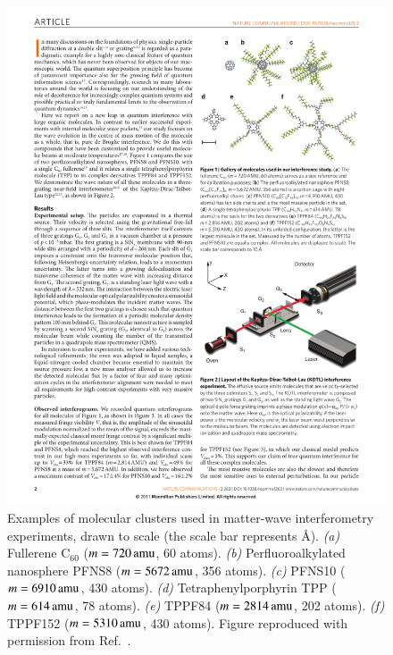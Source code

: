 \documentclass[3p,sort&compress]{elsarticle}
\begin{document}
\begin{figure}
\centering
\includegraphics[scale=1]{clusters.pdf}
\caption{Examples of molecular clusters used in matter-wave interferometry experiments, drawn to scale (the scale bar represents \unit[10]{\AA}). \emph{(a)} Fullerene C$_{60}$ ($m = \unit[720]{amu}$, 60 atoms). \emph{(b)} Perfluoroalkylated nanosphere PFNS8 ($m = \unit[5672]{amu}$, 356 atoms). \emph{(c)} PFNS10 ($m = \unit[6910]{amu}$, 430 atoms). \emph{(d)} Tetraphenylporphyrin TPP ($m = \unit[614]{amu}$, 78 atoms). \emph{(e)} TPPF84 ($m = \unit[2814]{amu}$, 202 atoms). \emph{(f)} TPPF152 ($m = \unit[5310]{amu}$, 430 atoms). Figure reproduced with permission from Ref.~\cite{Gerlich:2011:aa}. }
\label{fig:molecules}
\end{figure}
\end{document}
